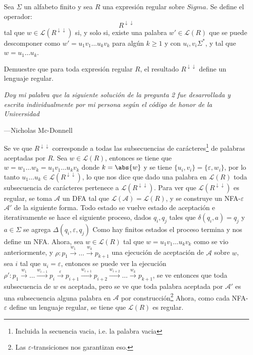 \documentclass{homework}
\newcommand{\ddarrow}{\ensuremath{{\downarrow\downarrow}}}
\begin{document}
\begin{p2}
    \begin{prob}
        Sea \(\Sigma\) un alfabeto finito y sea \(R\) una expresión regular sobre \(Sigma\). Se define el operador:
        \begin{equation*}
            R^{\ddarrow}
        \end{equation*}
        tal que \(w\in\mathcal{L}(R^{\ddarrow})\) si, y solo si, existe una palabra \(w'\in\mathcal{L}(R)\) que se puede descomponer como \(w'=u_1v_1\dots u_kv_k\) para algún \(k\geq 1\) y con \(u_i,v_i\Sigma^*\), y tal que \(w=u_1\dots u_k\).


        \noindent Demuestre que para toda expresión regular \(R\), el resultado \(R^{\ddarrow}\) define un lenguaje regular.
    \end{prob}

    \begin{sol}
        \textit{Doy mi palabra que la siguiente solución de la pregunta 2 fue desarrollada y escrita individualmente por mi persona según el código de honor de la Universidad}
        \begin{flushright}
            ---Nicholas Mc-Donnell
        \end{flushright}
        Se ve que \(R^\ddarrow\) corresponde a todas las subsecuencias de carácteres\footnote{Incluida la secuencia vacia, i.e. la palabra vacia} de palabras aceptadas por \(R\). Sea \(w\in\mathcal{L}(R)\), entonces se tiene que \(w=w_1\dots w_k=u_1v_1\dots u_kv_k\) donde \(k=\abs{w}\) y se tiene \(\{u_i,v_i\}=\{\varepsilon,w_i\}\), por lo tanto \(u_1\dots u_k\in\mathcal{L}(R^\ddarrow)\), lo que nos dice que dado una palabra en \(\mathcal{L}(R)\) toda subsecuencia de carácteres pertenece a \(\mathcal{L}(R^\ddarrow)\). Para ver que \(\mathcal{L}(R^\ddarrow)\) es regular, se toma \(\mathcal{A}\) un DFA tal que \(\mathcal{L}(\mathcal{A})=\mathcal{L}(R)\), y se construye un NFA-\(\varepsilon\) \(\mathcal{A}'\) de la siguiente forma. Todo estado se vuelve estado de aceptación e iterativamente se hace el siguiente proceso, dados \(q_i,q_j\) tales que \(\delta(q_i,a)=q_j\) y \(a\in\Sigma\) se agrega \(\Delta(q_i,\varepsilon,q_j)\) Como hay finitos estados el proceso termina y nos define un NFA. Ahora, sea \(w\in\mathcal{L}(R)\) tal que \(w=u_1v_1\dots u_kv_k\) como se vio anteriormente, y \(\rho:p_1\xrightarrow{w_1}\dots \xrightarrow{w_k}p_{k+1}\) una ejecución de aceptación de \(\mathcal{A}\) sobre \(w\), sea \(i\) tal que \(u_i=\varepsilon\), entonces se puede ver la ejecución \(\rho':p_1\xrightarrow{w_1}\dots\xrightarrow{w_{i-1}}p_{i}\xrightarrow{\varepsilon}p_{i+1}\xrightarrow{w_{i+1}}p_{i+2}\xrightarrow{w_{i+2}}\dots\xrightarrow{w_k}p_{k+1}\), se ve entonces que toda subsecuencia de \(w\) es aceptada, pero se ve que toda palabra aceptada por \(\mathcal{A}'\) es una subsecuencia alguna palabra en \(\mathcal{A}\) por construcción\footnote{Las \(\varepsilon\)-transiciones nos garantizan eso.} Ahora, como cada NFA-\(\varepsilon\) define un lenguaje regular, se tiene que \(\mathcal{L}(R)\) es regular.
    \end{sol}
\end{p2}
\end{document}
